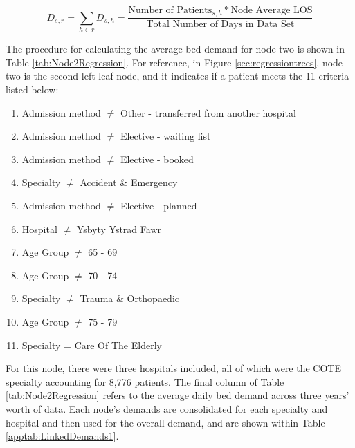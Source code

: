 \documentclass[../thesis.tex]{subfiles}
\begin{document}
\begin{equation}\label{eq:treedemand1}
        D_{s,r} = \sum\limits_{h \in r} D_{s,h} = \frac{\text{Number of Patients}_{s,h}*\text{Node Average LOS}}{\text{Total Number of Days in Data Set}}
\end{equation}

The procedure for calculating the average bed demand for node two is shown in Table \ref{tab:Node2Regression}. For reference, in Figure \ref{sec:regressiontrees}, node two is the second left leaf node, and it indicates if a patient meets the 11 criteria listed below:
\begin{enumerate}
    \item Admission method $\neq$ Other - transferred from another hospital
    \item Admission method $\neq$ Elective - waiting list
    \item Admission method $\neq$ Elective - booked
    \item Specialty $\neq$ Accident \& Emergency
    \item Admission method $\neq$ Elective - planned
    \item Hospital $\neq$ Ysbyty Ystrad Fawr
    \item Age Group $\neq$ 65 - 69
    \item Age Group $\neq$ 70 - 74
    \item Specialty $\neq$ Trauma \& Orthopaedic
    \item Age Group $\neq$ 75 - 79
    \item Specialty = Care Of The Elderly
\end{enumerate}

For this node, there were three hospitals included, all of which were the COTE specialty accounting for 8,776 patients. The final column of Table \ref{tab:Node2Regression} refers to the average daily bed demand across three years' worth of data. Each node's demands are consolidated for each specialty and hospital and then used for the overall demand, and are shown within Table \ref{apptab:LinkedDemands1}.
\begin{table}[h!]
    \centering{}
    \caption{The count of admissions and the associated average LOS for each hospital and specialty within the second node of the regression tree. The average daily bed demand has additionally been calculated.}
    \label{tab:Node2Regression}
\end{table}
\end{document}
